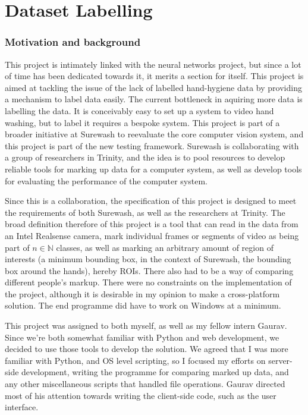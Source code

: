 \part{Dataset Labelling}
\section{Motivation and background}
This project is intimately linked with the neural networks project, but since a lot of time has been dedicated towards it, it merits a section for itself. This project is aimed at tackling the issue of the lack of labelled hand-hygiene data by providing a mechanism to label data easily. The current bottleneck in aquiring more data is labelling the data. It is conceivably easy to set up a system to video hand washing, but to label it requires a bespoke system. This project is part of a broader initiative at Surewash to reevaluate the core computer vision system, and this project is part of the new testing framework. Surewash is collaborating with a group of researchers in Trinity, and the idea is to pool resources to develop reliable tools for marking up data for a computer system, as well as develop tools for evaluating the performance of the computer system.

Since this is a collaboration, the specification of this project is designed to meet the requirements of both Surewash, as well as the researchers at Trinity. The broad definition therefore of this project is a tool that can read in the data from an Intel Realsense camera, mark individual frames or segments of video as being part of $n \in \mathbb{N}$ classes, as well as marking an arbitrary amount of region of interests (a minimum bounding box, in the context of Surewash, the bounding box around the hands), hereby ROIs. There also had to be a way of comparing different people's markup. There were no constraints on the implementation of the project, although it is desirable in my opinion to make a cross-platform solution. The end programme did have to work on Windows at a minimum.

This project was assigned to both myself, as well as my fellow intern Gaurav. Since we're both somewhat familiar with Python and web development, we decided to use those tools to develop the solution. We agreed that I was more familiar with Python, and OS level scripting, so I focused my efforts on server-side development, writing the programme for comparing marked up data, and any other miscellaneous scripts that handled file operations. Gaurav directed most of his attention towards writing the client-side code, such as the user interface.

